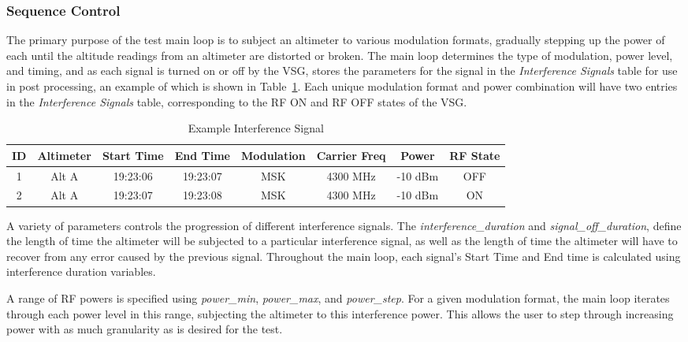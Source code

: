 \subsubsection{Sequence Control}\label{subsub:sequence}
The primary purpose of the test main loop is to subject an altimeter to various modulation formats, gradually stepping up the power of each until the altitude readings from an altimeter are distorted or broken. The main loop determines the type of modulation, power level, and timing, and as each signal is turned on or off by the VSG, stores the parameters for the signal in the \textit{Interference Signals} table for use in post processing, an example of which is shown in Table~\ref{tab:Interference}. Each unique modulation format and power combination will have two entries in the \textit{Interference Signals} table, corresponding to the RF ON and RF OFF states of the VSG.  
\begin{table}[]
\centering
\begin{tabular}{@{}cccccccc@{}}
\toprule
ID & Altimeter   & Start Time          & End Time            & Modulation &Carrier Freq& Power & RF State \\ \midrule
1  & Alt A & 19:23:06 & 19:23:07 & MSK & 4300  MHz & -10  dBm & OFF      \\
2  & Alt A & 19:23:07 & 19:23:08 & MSK & 4300   MHz & -10 dBm& ON       \\ \bottomrule
\end{tabular}
\caption{Example Interference Signal}
\label{tab:Interference}
\end{table}

A variety of parameters controls the progression of different interference signals. The \textit{interference\_duration} and \textit{signal\_off\_duration}, define the length of time the altimeter will be subjected to a particular interference signal, as well as the length of time the altimeter will have to recover from any error caused by the previous signal. Throughout the main loop, each signal's Start Time and End time is calculated using interference duration variables. 

A range of RF powers is specified using \textit{power\_min}, \textit{power\_max}, and \textit{power\_step}. For a given modulation format, the main loop iterates through each power level in this range, subjecting the altimeter to this interference power. This allows the user to step through increasing power with as much granularity as is desired for the test.


